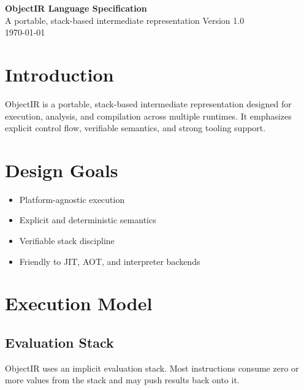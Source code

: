 \documentclass[11pt,a4paper]{article}
\begin{document}
	
	\begin{titlepage}
		\centering
		\vspace*{3cm}
		{\Huge\bfseries ObjectIR Language Specification}\\[0.5cm]
		{\Large A portable, stack-based intermediate representation}
		\vfill
		Version 1.0\\
		\today
		\vfill
	\end{titlepage}
	
	\tableofcontents
	\newpage
	
	\section{Introduction}
	ObjectIR is a portable, stack-based intermediate representation designed for execution, analysis, and compilation across multiple runtimes. It emphasizes explicit control flow, verifiable semantics, and strong tooling support.
	
	\section{Design Goals}
	\begin{itemize}
		\item Platform-agnostic execution
		\item Explicit and deterministic semantics
		\item Verifiable stack discipline
		\item Friendly to JIT, AOT, and interpreter backends
	\end{itemize}
	
	\section{Execution Model}
	
	\subsection{Evaluation Stack}
	ObjectIR uses an implicit evaluation stack. Most instructions consume zero or more values from the stack and may push results back onto it.
	
\end{document}
